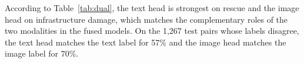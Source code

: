 \documentclass[11pt,a4paper]{article}
\begin{document}
According to Table~\ref{tab:dual}, the text head is strongest on rescue
and the image head on infrastructure damage, which matches the
complementary roles of the two modalities in the fused models. On the
1,267 test pairs whose labels disagree, the text head matches the text
label for 57\% and the image head matches the image label for 70\%.
\end{document}
